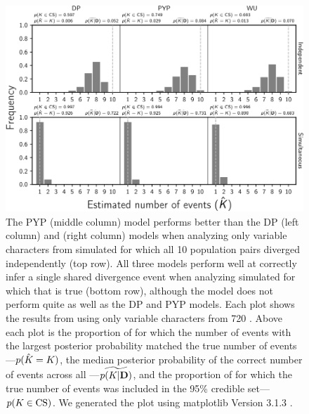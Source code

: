 \begin{figure}[htbp]
    \begin{center}
        \includegraphics[width=\textwidth,height=\textheight,keepaspectratio]{../images/from-project-repo/var-only-infer-columns-by-fixed-rows-nevents-cropped.pdf}
        \captionsetup{name=Figure S, labelformat=noSpace, listformat=sFigList}
        \caption{
        The PYP (middle column) model performs better than the DP (left column)
        and \wunif (right column) models when analyzing only variable characters
        from simulated \datasets for which all 10 population pairs diverged
        independently (top row).
        All three models perform well at correctly infer a single shared
        divergence event when analyzing simulated \datasets for which that is
        true (bottom row), although the \wunif model does not perform quite as
        well as the DP and PYP models.
        Each plot shows the results from using only variable characters from
        720 \datasets.
        Above each plot is
        the proportion of \datasets for which the number of events with the largest
        posterior probability matched the true number of events---$p(\hat{K_{}}
        = K_{})$,
        the median posterior probability of the correct number of events across all
        \datasets---$\widetilde{p(K_{}|\mathbf{D})}$, and
        the proportion of \datasets for which the true number of events was
        included in the 95\% credible set---$p(K_{} \in
        \textrm{CS})$.
        We generated the plot using matplotlib Version 3.1.3
        \citep{matplotlib}.
        }
        \label{fig:varonlyneventsfixedcomparison}
    \end{center}
\end{figure}

